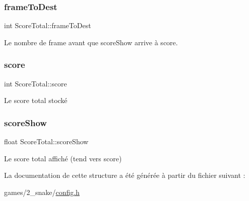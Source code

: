 \subsubsection{\texorpdfstring{frame\+To\+Dest}{frameToDest}}
{\footnotesize\ttfamily int Score\+Total\+::frame\+To\+Dest}



Le nombre de frame avant que score\+Show arrive à score. 

\mbox{\label{struct_score_total_a5f72868887f5434097710d75139abd69}} 
\subsubsection{\texorpdfstring{score}{score}}
{\footnotesize\ttfamily int Score\+Total\+::score}



Le score total stocké 

\mbox{\label{struct_score_total_ab878dcb325c9c66be76d0eb080d63c39}} 
\subsubsection{\texorpdfstring{score\+Show}{scoreShow}}
{\footnotesize\ttfamily float Score\+Total\+::score\+Show}



Le score total affiché (tend vers score) 



La documentation de cette structure a été générée à partir du fichier suivant \+:\begin{DoxyCompactItemize}
\item 
games/2\+\_\+snake/\hyperlink{2__snake_2config_8h}{config.\+h}\end{DoxyCompactItemize}
